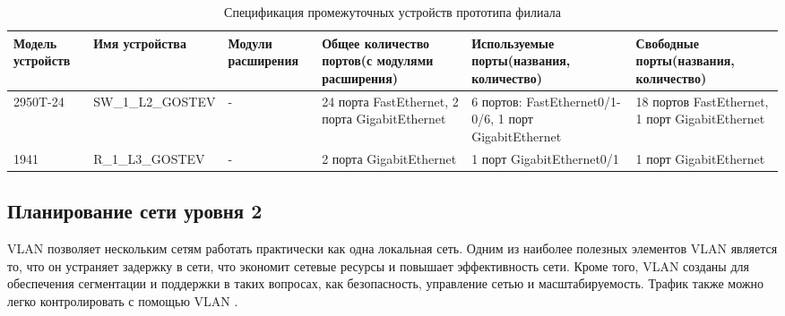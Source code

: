 \documentclass[14pt, a4paper]{extarticle}
\numberwithin{equation}{section}
\begin{document}
\begin{landscape}
\begin{table}[H]
\centering
\small
\caption{Спецификация промежуточных устройств прототипа филиала}
\begin{tabular}{|m{2.5cm}|m{4cm}|m{3cm}|m{4.2cm}|m{5.3cm}|m{4cm}|}
\hline
\textbf{Модель устройств} & \textbf{Имя устройства} & \textbf{Модули расширения} & \textbf{Общее количество портов(с модулями расширения)} & \textbf{Используемые порты(названия, количество)} & \textbf{Свободные порты(названия, количество)} \\
\hline
2950T-24 &
SW\_1\_L2\_GOSTEV &
- &
24 порта FastEthernet, 2 порта GigabitEthernet &
6 портов: FastEthernet0/1-0/6, 1 порт GigabitEthernet &
18 портов FastEthernet, 1 порт GigabitEthernet \\
\hline
1941 &
R\_1\_L3\_GOSTEV &
- &
2 порта GigabitEthernet &
1 порт GigabitEthernet0/1 &
1 порт GigabitEthernet \\
\hline
\end{tabular}
\end{table}
\end{landscape}



\subsection{Планирование сети уровня 2}

VLAN позволяет нескольким сетям работать практически как одна локальная сеть. Одним из наиболее полезных элементов VLAN является то, что он устраняет задержку в сети, что экономит сетевые ресурсы и повышает эффективность сети. Кроме того, VLAN созданы для обеспечения сегментации и поддержки в таких вопросах, как безопасность, управление сетью и масштабируемость. Трафик также можно легко контролировать с помощью VLAN \cite{vlan}.
\end{document}
